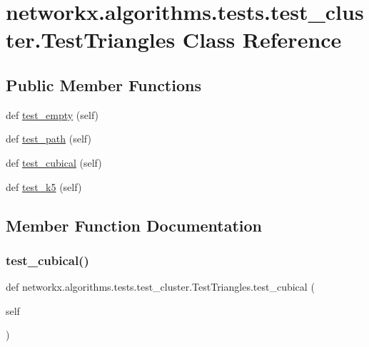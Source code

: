 \hypertarget{classnetworkx_1_1algorithms_1_1tests_1_1test__cluster_1_1TestTriangles}{}\section{networkx.\+algorithms.\+tests.\+test\+\_\+cluster.\+Test\+Triangles Class Reference}
\label{classnetworkx_1_1algorithms_1_1tests_1_1test__cluster_1_1TestTriangles}
\subsection*{Public Member Functions}
\begin{DoxyCompactItemize}
\item 
def \hyperlink{classnetworkx_1_1algorithms_1_1tests_1_1test__cluster_1_1TestTriangles_a5ac21082a6a28a783b67a0248478ef86}{test\+\_\+empty} (self)
\item 
def \hyperlink{classnetworkx_1_1algorithms_1_1tests_1_1test__cluster_1_1TestTriangles_a8010eab884f0042aab48dfba14524087}{test\+\_\+path} (self)
\item 
def \hyperlink{classnetworkx_1_1algorithms_1_1tests_1_1test__cluster_1_1TestTriangles_a60755d87d600b19e1f6d6c80e9b6209b}{test\+\_\+cubical} (self)
\item 
def \hyperlink{classnetworkx_1_1algorithms_1_1tests_1_1test__cluster_1_1TestTriangles_a9cd0a09c1a6bce1d283bebd43a9f858c}{test\+\_\+k5} (self)
\end{DoxyCompactItemize}


\subsection{Member Function Documentation}
\mbox{\label{classnetworkx_1_1algorithms_1_1tests_1_1test__cluster_1_1TestTriangles_a60755d87d600b19e1f6d6c80e9b6209b}} 
\subsubsection{\texorpdfstring{test\+\_\+cubical()}{test\_cubical()}}
{\footnotesize\ttfamily def networkx.\+algorithms.\+tests.\+test\+\_\+cluster.\+Test\+Triangles.\+test\+\_\+cubical (\begin{DoxyParamCaption}\item[{}]{self }\end{DoxyParamCaption})}

